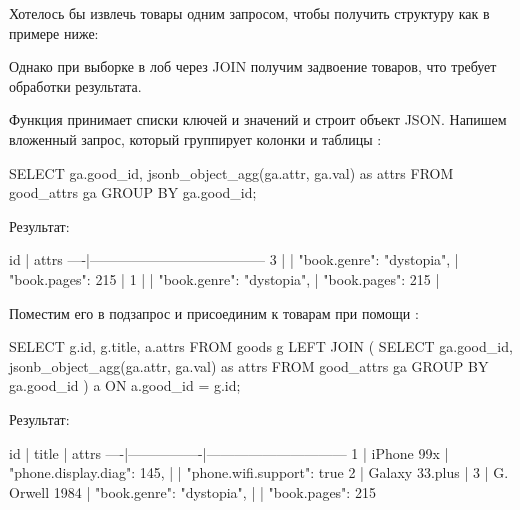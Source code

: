 Хотелось бы извлечь товары одним запросом, чтобы получить структуру как в примере ниже:

\begin{english}
  \begin{clojure}
  \end{clojure}
\end{english}

Однако при выборке в лоб через JOIN получим задвоение товаров, что требует обработки результата.

Функция  принимает списки ключей и значений и строит объект JSON. Напишем вложенный запрос, который группирует колонки  и  таблицы :

\begin{english}
  \begin{clojure}
SELECT
  ga.good_id,
  jsonb_object_agg(ga.attr, ga.val) as attrs
FROM
  good_attrs ga
GROUP BY
  ga.good_id;
  \end{clojure}
\end{english}

Результат:

\begin{english}
  \begin{text}
 id |                attrs
----|--------------------------------------
  3 | {
    |   "book.genre": "dystopia",
    |   "book.pages": 215
    | }
  1 | {
    |   "book.genre": "dystopia",
    |   "book.pages": 215
    | }
  \end{text}
\end{english}

Поместим его в подзапрос и присоединим к товарам при помощи :

\begin{english}
  \begin{sql}
SELECT
  g.id,
  g.title,
  a.attrs
FROM
  goods g
LEFT JOIN (
  SELECT
    ga.good_id,
    jsonb_object_agg(ga.attr, ga.val) as attrs
  FROM good_attrs ga
    GROUP BY ga.good_id
) a ON a.good_id = g.id;
  \end{sql}
\end{english}

Результат:

\begin{english}
  \begin{text}
 id |     title      |             attrs
----|----------------|------------------------------
  1 | iPhone 99x     | {"phone.display.diag": 145,
    |                |  "phone.wifi.support": true}
  2 | Galaxy 33.plus |
  3 | G. Orwell 1984 | {"book.genre": "dystopia",
    |                |  "book.pages": 215}
  \end{text}
\end{english}

